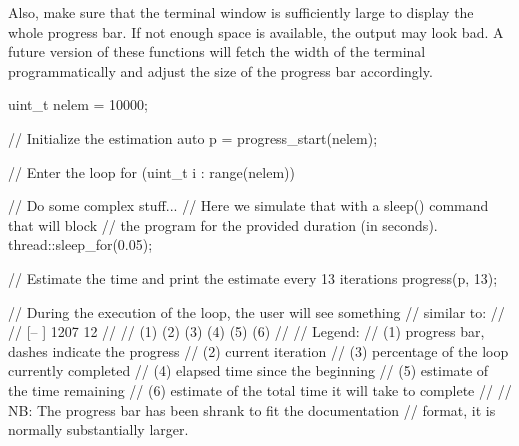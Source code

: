 Also, make sure that the terminal window is sufficiently large to display the whole progress bar. If not enough space is available, the output may look bad. A future version of these functions will
fetch the width of the terminal programmatically and adjust the size of the progress bar accordingly.

\begin{example}
\begin{cppcode}
uint_t nelem = 10000;

// Initialize the estimation
auto p = progress_start(nelem);

// Enter the loop
for (uint_t i : range(nelem)) {
    // Do some complex stuff...
    // Here we simulate that with a sleep() command that will block
    // the program for the provided duration (in seconds).
    thread::sleep_for(0.05);

    // Estimate the time and print the estimate every 13 iterations
    progress(p, 13);
}

// During the execution of the loop, the user will see something
// similar to:
//
// [--            ] 1207  12%
//
//        (1)        (2)  (3)      (4)           (5)          (6)
//
// Legend:
//  (1) progress bar, dashes indicate the progress
//  (2) current iteration
//  (3) percentage of the loop currently completed
//  (4) elapsed time since the beginning
//  (5) estimate of the time remaining
//  (6) estimate of the total time it will take to complete
//
// NB: The progress bar has been shrank to fit the documentation
// format, it is normally substantially larger.
\end{cppcode}
\end{example}

